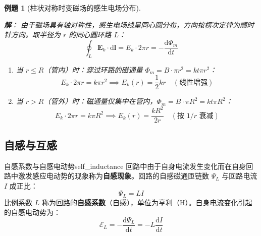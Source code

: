 \documentclass[11pt,a4paper,fontset=fandol]{ctexart}
\newtheorem{example}{例题}[section]
\theoremstyle{remark}
\begin{document}
\begin{example}[柱状对称时变磁场的感生电场分布]
\begin{center}
\end{center}

\textbf{解}：
由于磁场具有轴对称性，感生电场线呈同心圆分布，方向按楞次定律为顺时针方向。取半径为 $r$ 的同心圆环路 $L$：
\begin{equation*}
    \oint_L \bm{E}_k \cdot \mathrm{d}\bm{l} = E_k \cdot 2\pi r = -\frac{\mathrm{d}\Phi_m}{\mathrm{d}t}
\end{equation*}
\begin{enumerate}
    \item 当 $r \le R$（管内）时：穿过环路的磁通量 $\Phi_m = B \cdot \pi r^2 = k t \pi r^2$：
    \begin{equation*}
        E_k \cdot 2\pi r = k \pi r^2 \implies E_k(r) = \frac{1}{2} k r \quad (\text{线性增强})
    \end{equation*}
    \item 当 $r > R$（管外）时：磁通量仅集中在管内，$\Phi_m = B \cdot \pi R^2 = k t \pi R^2$：
    \begin{equation*}
        E_k \cdot 2\pi r = k \pi R^2 \implies E_k(r) = \frac{k R^2}{2r} \quad (\text{按 } 1/r \text{ 衰减})
    \end{equation*}
\end{enumerate}
\end{example}

\subsection{自感与互感}

\begin{definition}{自感系数与自感电动势}{self_inductance}
回路中由于自身电流发生变化而在自身回路中激发感应电动势的现象称为\textbf{自感现象}。回路的自感磁通匝链数 $\Psi_L$ 与回路电流 $I$ 成正比：
\begin{equation}
    \Psi_L = L I
\end{equation}
比例系数 $L$ 称为回路的\textbf{自感系数}（自感），单位为亨利（$\mathrm{H}$）。自身电流变化引起的自感电动势为：
\begin{equation}
    \mathcal{E}_L = -\frac{\mathrm{d}\Psi_L}{\mathrm{d}t} = -L \frac{\mathrm{d}I}{\mathrm{d}t}
\end{equation}
\end{definition}
\end{document}
